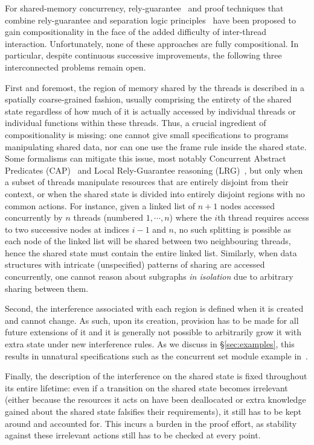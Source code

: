 For shared-memory concurrency, rely-guarantee~\cite{rg} and proof
techniques that combine rely-guarantee and separation logic
principles~\cite{viktor-marriage,dg,lrg,cap-ecoop10,icap,tada} have
been proposed to gain compositionality in the face of the added
difficulty of inter-thread interaction. Unfortunately, none of these
approaches are fully compositional. In particular, despite continuous
successive improvements, the following three interconnected problems
remain open.

First and foremost, the region of memory shared by the threads is
described in a spatially coarse-grained fashion, usually comprising
the entirety of the shared state regardless of how much of it is
actually accessed by individual threads or individual functions within
these threads. Thus, a crucial ingredient of compositionality is
missing: one cannot give small specifications to programs manipulating
shared data, nor can one use the frame rule inside the shared
state. Some formalisms can mitigate this issue, most notably
Concurrent Abstract Predicates (CAP)~\cite{cap-ecoop10} and Local
Rely-Guarantee reasoning (LRG)~\cite{lrg}, but only when a subset of threads
manipulate resources that are entirely disjoint from their context, or
when the shared state is divided into entirely disjoint regions with no
common actions. For instance, given a linked list of $n+1$ nodes accessed concurrently by $n$ threads (numbered $1, \cdots, n$) where the $i$th thread requires access to two successive nodes at indices $i-1$ and $n$, no such splitting is possible as each
node of the linked list will be shared between two neighbouring
threads, hence the shared state must contain the entire linked
list. Similarly, when data structures with intricate (unspecified) patterns of sharing are accessed concurrently, one cannot reason about subgraphs
\emph{in isolation} due to arbitrary sharing between them.

Second, the interference associated with each region is defined when it is created and cannot change. As such, upon its creation, provision has to be made for
all future extensions of it and it is generally not possible to
arbitrarily grow it with extra state under new interference rules.
As we discuss in \S\ref{sec:examples}, this results in unnatural specifications such as the concurrent set module example in~\cite{cap-ecoop10}. 

Finally, the description of the interference on the shared state is
fixed throughout its entire lifetime: even if a transition on the shared state 
becomes irrelevant (either because the resources it acts on have been
deallocated or extra knowledge gained about the shared state
falsifies their requirements), it still has to be kept around and accounted for. This incurs
a burden in the proof effort, as stability against these irrelevant
actions still has to be checked at every point.

